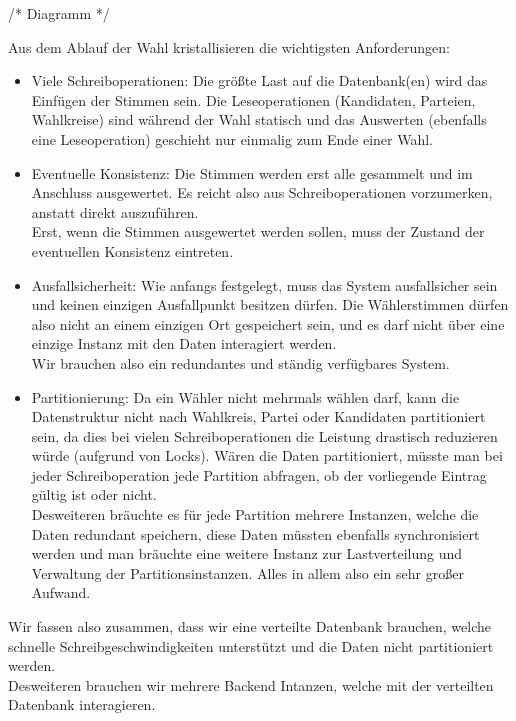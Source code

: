 \documentclass{article}  %
\begin{document}
/* Diagramm */ 

Aus dem Ablauf der Wahl kristallisieren die wichtigsten Anforderungen: \\
\begin{itemize}
    \item Viele Schreiboperationen: Die größte Last auf die Datenbank(en) wird das Einfügen der Stimmen sein. Die Leseoperationen (Kandidaten, Parteien, Wahlkreise) sind während der Wahl statisch und das Auswerten (ebenfalls eine Leseoperation) geschieht nur einmalig zum Ende einer Wahl. 

    \item Eventuelle Konsistenz: Die Stimmen werden erst alle gesammelt und im Anschluss ausgewertet. Es reicht also aus Schreiboperationen vorzumerken, anstatt direkt auszuführen. \\ Erst, wenn die Stimmen ausgewertet werden sollen, muss der Zustand der eventuellen Konsistenz eintreten.

    \item Ausfallsicherheit: Wie anfangs festgelegt, muss das System ausfallsicher sein und keinen einzigen Ausfallpunkt besitzen dürfen. Die Wählerstimmen dürfen also nicht an einem einzigen Ort gespeichert sein, und es darf nicht über eine einzige Instanz mit den Daten interagiert werden. \\
    Wir brauchen also ein redundantes und ständig verfügbares System.


    \item Partitionierung: Da ein Wähler nicht mehrmals wählen darf, kann die Datenstruktur nicht nach Wahlkreis, Partei oder Kandidaten partitioniert sein, da dies bei vielen Schreiboperationen die Leistung drastisch reduzieren würde (aufgrund von Locks). Wären die Daten partitioniert, müsste man bei jeder Schreiboperation jede Partition abfragen, ob der vorliegende Eintrag gültig ist oder nicht. \\ Desweiteren bräuchte es für jede Partition mehrere Instanzen, welche die Daten redundant speichern, diese Daten müssten ebenfalls synchronisiert werden und man bräuchte eine weitere Instanz zur Lastverteilung und Verwaltung der Partitionsinstanzen. Alles in allem also ein sehr großer Aufwand.

 
\end{itemize} 

Wir fassen also zusammen, dass wir eine verteilte Datenbank brauchen, welche schnelle Schreibgeschwindigkeiten unterstützt und die Daten nicht partitioniert werden. \\
Desweiteren brauchen wir mehrere Backend Intanzen, welche mit der verteilten Datenbank interagieren. \\
\end{document}
